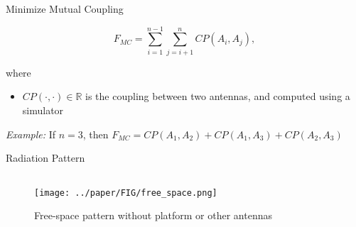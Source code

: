 \documentclass{beamer}
\begin{document}
\begin{frame}{Minimize Mutual Coupling}
    \begin{tcolorbox}[colback=green!5]
        \begin{equation}
            F_{MC} = \sum_{i=1}^{n-1}\sum_{j=i+1}^{n} CP(A_i, A_j),
        \end{equation}
    \end{tcolorbox}
    where
    \begin{itemize}
        \item $CP(\cdot, \cdot) \in \mathbb R$ is the coupling between two antennas, and computed using a simulator
    \end{itemize}
    \vspace{2mm}
    \small\textit{Example:} If $n=3$, then $F_{MC} = CP(A_1, A_2) + CP(A_1, A_3) + CP(A_2, A_3)$
\end{frame}

\begin{frame}{Radiation Pattern}
    \begin{columns}
        \begin{column}{0.5\linewidth}
            \begin{figure}
                \centering
                \texttt{[image: ../paper/FIG/free\_space.png]}
                \caption*{\tiny{Free-space pattern without platform or other antennas}}
            \end{figure}
        \end{column}
        \begin{column}{0.5\linewidth}
        \end{column}
    \end{columns}
\end{frame}
\end{document}
